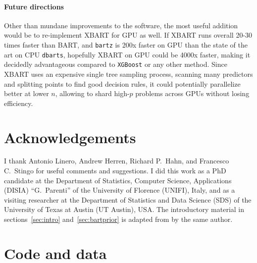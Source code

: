 \documentclass{article}
\let\oldmarginpar\marginpar
\renewcommand{\marginpar}[1]{\oldmarginpar{\sffamily\scriptsize #1}}
\begin{document}
    \paragraph{Future directions}

    Other than mundane improvements to the software, the most useful addition would be to re-implement XBART \autocite{he2021} for GPU as well. If XBART runs overall 20-30 times faster than BART, and \texttt{bartz} is 200x faster on GPU than the state of the art on CPU \texttt{dbarts}, hopefully XBART on GPU could be 4000x faster, making it decidedly advantageous compared to \texttt{XGBoost} or any other method. Since XBART uses an expensive single tree sampling process, scanning many predictors and splitting points to find good decision rules, it could potentially parallelize better at lower $n$, allowing to shard high-$p$ problems across GPUs without losing efficiency.

    \section*{Acknowledgements}

    I thank Antonio Linero, Andrew Herren, Richard P.\ Hahn, and Francesco C.\ Stingo for useful comments and suggestions. I did this work as a PhD candidate at the Department of Statistics, Computer Science, Applications (DISIA) ``G.~Parenti'' of the University of Florence (UNIFI), Italy, and as a visiting researcher at the Department of Statistics and Data Science (SDS) of the University of Texas at Austin (UT Austin), USA. The introductory material in sections~\ref{sec:intro} and~\ref{sec:bartprior} is adapted from \textcite{petrillo2024d} by the same author.

    \section*{Code and data}

    \marginpar{TODO}

    \printbibliography
\end{document}
